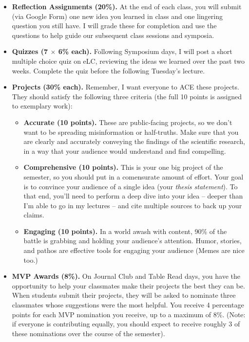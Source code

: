 \documentclass[11pt, letterpaper]{article}
\begin{document}
\begin{itemize}
	\item \textbf{Reflection Assignments (20\%).} At the end of each class, you will submit (via Google Form) one new idea you learned in class and one lingering question you still have. I will grade these for completion and use the questions to help guide our subsequent class sessions and symposia.
	\item \textbf{Quizzes (7 $\times$ 6\% each).} Following Symposium days, I will post a short multiple choice quiz on eLC, reviewing the ideas we learned over the past two weeks. Complete the quiz before the following Tuesday's lecture.
	\item \textbf{Projects (30\% each).} Remember, I want everyone to ACE these projects. They should satisfy the following three criteria (the full 10 points is assigned to exemplary work):
		\begin{itemize}
			\item \textbf{Accurate (10 points).} These are public-facing projects, so we don't want to be spreading misinformation or half-truths. Make sure that you are clearly and accurately conveying the findings of the scientific research, in a way that your audience would understand and find compelling.
			\item \textbf{Comprehensive (10 points).} This is your one big project of the semester, so you should put in a comensurate amount of effort. Your goal is to convince your audience of a single idea (your \textit{thesis statement}). To that end, you'll need to perform a deep dive into your idea -- deeper than I'm able to go in my lectures -- and cite multiple sources to back up your claims. 
			\item \textbf{Engaging (10 points).} In a world awash with content, 90\% of the battle is grabbing and holding your audience's attention. Humor, stories, and pathos are effective tools for engaging your audience (Memes are nice too.)
		\end{itemize}
	\item \textbf{MVP Awards (8\%).} On Journal Club and Table Read days, you have the opportunity to help your classmates make their projects the best they can be. When students submit their projects, they will be asked to nominate three classmates whose suggestions were the most helpful. You receive 4 percentage points for each MVP nomination you receive, up to a maximum of 8\%. (Note: if everyone is contributing equally, you should expect to receive roughly 3 of these nominations over the course of the semester).
\end{itemize}
\end{document}
